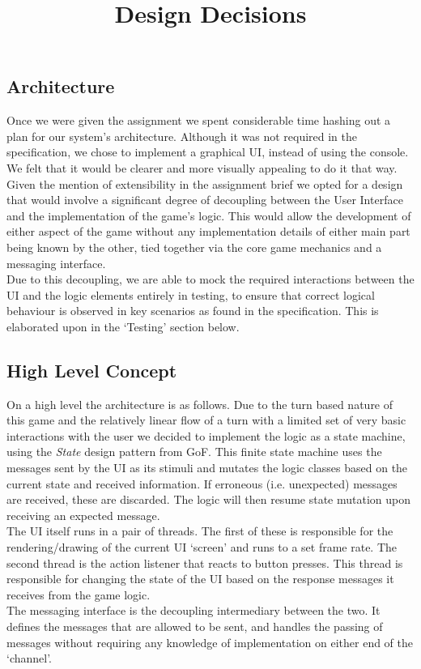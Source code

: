 \documentclass[a4paper, 11pt]{article}
\title{Design Decisions}
\begin{document}
	\maketitle
	\subsection*{Architecture}
	Once we were given the assignment we spent considerable time hashing out a plan for our system's architecture. Although it was not required in the specification, we chose to implement a graphical UI, instead of using the console. We felt that it would be clearer and more visually appealing to do it that way.\\	 
	Given the mention of extensibility in the assignment brief we opted for a design that would involve a significant degree of decoupling between the User Interface and the implementation of the game's logic. This would allow the development of either aspect of the game without any implementation details of either main part being known by the other, tied together via the core game mechanics and a messaging interface.\\	 
	Due to this decoupling, we are able to mock the required interactions between the UI and the logic elements entirely in testing, to ensure that correct logical behaviour is observed in key scenarios as found in the specification. This is elaborated upon in the `Testing' section below.
	\subsection*{High Level Concept}
	On a high level the architecture is as follows. Due to the turn based nature of this game and the relatively linear flow of a turn with a limited set of very basic interactions with the user we decided to implement the logic as a state machine, using the \textit{State} design pattern from GoF. This finite state machine uses the messages sent by the UI as its stimuli and mutates the logic classes based on the current state and received information. If erroneous (i.e. unexpected) messages are received, these are discarded. The logic will then resume state mutation upon receiving an expected message.\\	
	The UI itself runs in a pair of threads. The first of these is responsible for the rendering/drawing of the current UI `screen' and runs to a set frame rate. The second thread is the action listener that reacts to button presses. This thread is responsible for changing the state of the UI based on the response messages it receives from the game logic.\\	
	The messaging interface is the decoupling intermediary between the two. It defines the messages that are allowed to be sent, and handles the passing of messages without requiring any knowledge of implementation on either end of the `channel'.\\	
\end{document}
